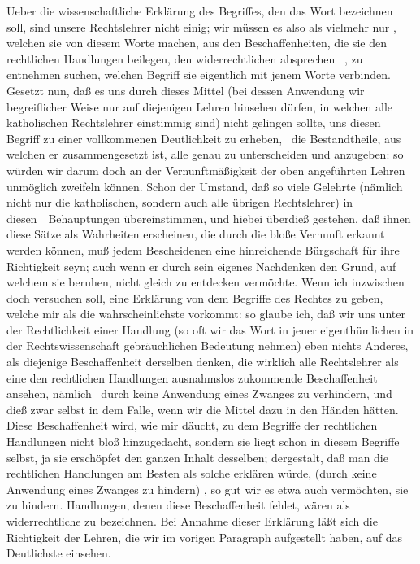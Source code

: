 Ueber die wissenschaftliche Erklärung des Begriffes, den das Wort  bezeichnen soll, sind unsere Rechtslehrer nicht einig; wir müssen es also  als vielmehr nur , welchen sie von diesem Worte machen, aus den Beschaffenheiten, die sie den rechtlichen Handlungen beilegen, den widerrechtlichen absprechen \udgl\ , zu entnehmen suchen, welchen Begriff sie eigentlich mit jenem Worte verbinden. Gesetzt nun, daß es uns durch dieses Mittel (bei dessen Anwendung wir begreiflicher Weise nur auf diejenigen Lehren hinsehen dürfen, in welchen alle katholischen Rechtslehrer einstimmig sind) nicht gelingen sollte, uns diesen Begriff zu einer vollkommenen Deutlichkeit zu erheben, \dh\  die Bestandtheile, aus welchen er zusammengesetzt ist, alle genau zu unterscheiden und anzugeben: so würden wir darum doch an der Vernunftmäßigkeit der oben angeführten Lehren unmöglich zweifeln können. Schon der Umstand, daß so viele Gelehrte (nämlich nicht nur die katholischen, sondern auch alle übrigen Rechtslehrer) in diesen~\ Behauptungen übereinstimmen, und hiebei überdieß gestehen, daß ihnen diese Sätze als Wahrheiten erscheinen, die durch die bloße Vernunft erkannt werden können, muß jedem Bescheidenen eine hinreichende Bürgschaft für ihre Richtigkeit seyn; auch wenn er durch sein eigenes Nachdenken den Grund, auf welchem sie beruhen, nicht gleich zu entdecken vermöchte. Wenn ich inzwischen doch versuchen soll, eine Erklärung von dem Begriffe des Rechtes zu geben, welche mir als die wahrscheinlichste vorkommt: so glaube ich, daß wir uns unter der Rechtlichkeit einer Handlung (so oft wir das Wort in jener eigenthümlichen in der Rechtswissenschaft gebräuchlichen Bedeutung nehmen) eben nichts Anderes, als diejenige Beschaffenheit derselben denken, die wirklich alle Rechtslehrer als eine den rechtlichen Handlungen ausnahmslos zukommende Beschaffenheit ansehen, nämlich  \dh\  durch keine Anwendung eines Zwanges zu verhindern, und dieß zwar selbst in dem Falle, wenn wir die Mittel dazu in den Händen hätten. Diese Beschaffenheit wird, wie mir däucht, zu dem Begriffe der rechtlichen Handlungen nicht bloß hinzugedacht, sondern sie liegt schon in diesem Begriffe selbst, ja sie erschöpfet den ganzen Inhalt desselben; dergestalt, daß man die rechtlichen Handlungen am Besten als solche erklären würde,  (durch keine Anwendung eines Zwanges zu hindern) , so gut wir es etwa auch vermöchten, sie zu hindern. Handlungen, denen diese Beschaffenheit fehlet, wären als widerrechtliche zu bezeichnen. Bei Annahme dieser Erklärung läßt sich die Richtigkeit der Lehren, die wir im vorigen Paragraph aufgestellt haben, auf das Deutlichste einsehen.
